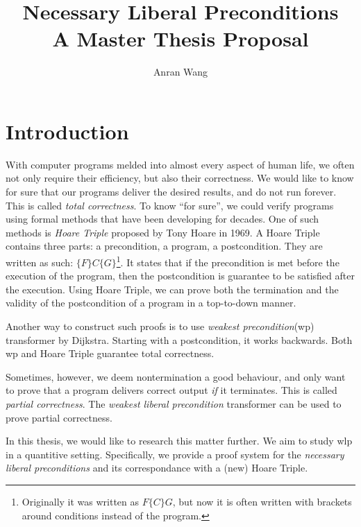 \documentclass[adraft,hidelinks]{eptcs}
\begin{document}
\def\titlerunning{Proposal}
\def\authorrunning{Anran Wang}
\title{\Large Necessary Liberal Preconditions \\\normalsize A Master Thesis Proposal}
\author{Anran Wang}
\maketitle


%
\section{Introduction}\label{sec:intro}

With computer programs melded into almost every aspect of human life, we often not only require their efficiency, but also their correctness. 
We would like to know for sure that our programs deliver the desired results, and do not run forever. 
This is called \textit{total correctness}. 
To know ``for sure'', we could verify programs using formal methods that have been developing for decades. 
One of such methods is \textit{Hoare Triple}\cite{Hoare1969} proposed by Tony Hoare in 1969. 
A Hoare Triple contains three parts: a precondition, a program, a postcondition. 
They are written as such: $\{F\}C\{G\}$\footnote{Originally it was written as $F \{C\} G$, but now it is often written with brackets around conditions instead of the program. }. 
It states that if the precondition is met before the execution of the program, then the postcondition is guarantee to be satisfied after the execution. 
Using Hoare Triple, we can prove both the termination and the validity of the postcondition of a program in a top-to-down manner. 

Another way to construct such proofs is to use \textit{weakest precondition}(wp)\cite{Dijkstra1975} transformer by Dijkstra. 
Starting with a postcondition, it works backwards. 
Both wp and Hoare Triple guarantee total correctness. 

Sometimes, however, we deem nontermination a good behaviour, and only want to prove that a program delivers correct output \textit{if} it terminates.
This is called \textit{partial correctness}. 
The \textit{weakest liberal precondition}\cite{Dijkstra1990} transformer can be used to prove partial correctness. 

In this thesis, we would like to research this matter further. 
We aim to study wlp in a quantitive setting. 
Specifically, we provide a proof system for the \textit{necessary liberal preconditions} and its correspondance with a (new) Hoare Triple.
\end{document}
